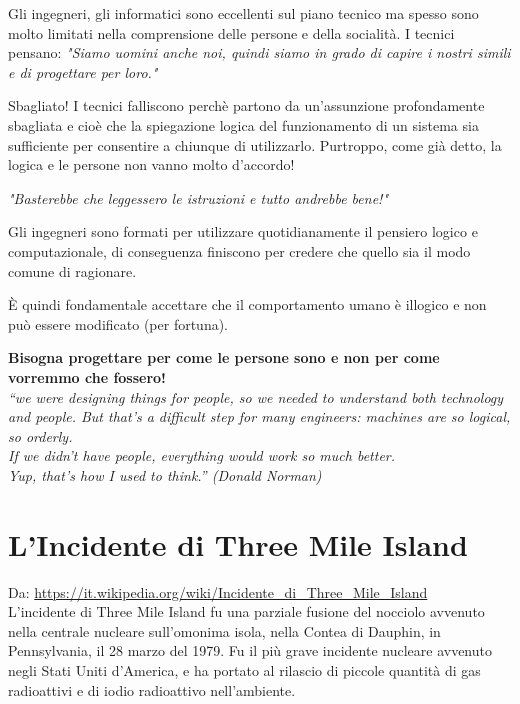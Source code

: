 Gli ingegneri, gli informatici sono eccellenti sul piano tecnico ma spesso sono molto limitati nella comprensione delle persone e della socialità.
I tecnici pensano: \textit{"Siamo uomini anche noi, quindi siamo in grado di capire i nostri simili e di progettare per loro."}

Sbagliato! I tecnici falliscono perchè partono da un'assunzione profondamente sbagliata e cioè che la spiegazione logica del funzionamento di un sistema sia sufficiente per consentire a chiunque di utilizzarlo. Purtroppo, come già detto, la logica e le persone non vanno molto d'accordo!

\begin{flushleft}
\textit{"Basterebbe che leggessero le istruzioni e tutto andrebbe bene!"}
\end{flushleft}


Gli ingegneri sono formati per utilizzare quotidianamente il pensiero logico e computazionale, di conseguenza finiscono per credere che quello sia il modo comune di ragionare. 


È quindi fondamentale accettare che il comportamento umano è illogico e non può essere modificato (per fortuna). 
\begin{flushleft}
\textbf{Bisogna progettare per come le persone sono e non per come vorremmo che fossero!}
\\
\textit{“we were designing things for people, so we needed to  understand both technology and people. But that’s a difficult step for many engineers: machines are so logical, so orderly. \\
If we didn’t have people, everything would work so much better. \\
Yup, that’s how I used to think.” (Donald Norman)}
\end{flushleft}

\section{L'Incidente di Three Mile Island }
Da: \url{https://it.wikipedia.org/wiki/Incidente_di_Three_Mile_Island}\\

L'incidente di Three Mile Island fu una parziale fusione del nocciolo avvenuto nella centrale nucleare sull'omonima isola, nella Contea di Dauphin, in Pennsylvania, il 28 marzo del 1979. Fu il più grave incidente nucleare avvenuto negli Stati Uniti d'America, e ha portato al rilascio di piccole quantità di gas radioattivi e di iodio radioattivo nell'ambiente.


